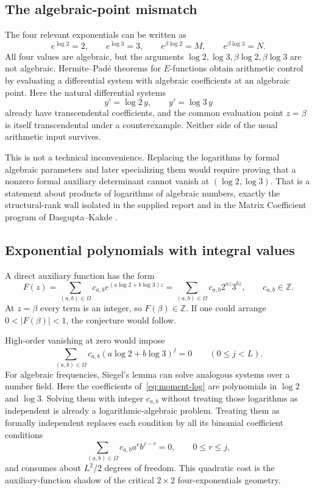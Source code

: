 \documentclass[11pt,oneside]{article}
\theoremstyle{definition}
\theoremstyle{remark}
\newcommand{\Z}{\mathbb Z}
\begin{document}
\subsection{The algebraic-point mismatch}

The four relevant exponentials can be written as
\[
 e^{\log2}=2,\qquad e^{\log3}=3,
 \qquad e^{\beta\log2}=M,
 \qquad e^{\beta\log3}=N.
\]
All four values are algebraic, but the arguments $\log2,\log3,\beta\log2,\beta\log3$ are not
algebraic.  Hermite--Pad\'e theorems for $E$-functions obtain arithmetic control by evaluating
a differential system with algebraic coefficients at an algebraic point.  Here the natural
differential systems
\[
 y'=\log2\,y,
 \qquad
 y'=\log3\,y
\]
already have transcendental coefficients, and the common evaluation point $z=\beta$ is itself
transcendental under a counterexample.  Neither side of the usual arithmetic input survives.

This is not a technical inconvenience.  Replacing the logarithms by formal algebraic
parameters and later specializing them would require proving that a nonzero formal auxiliary
determinant cannot vanish at $(\log2,\log3)$.  That is a statement about products of
logarithms of algebraic numbers, exactly the structural-rank wall isolated in the supplied
report and in the Matrix Coefficient program of Dasgupta--Kakde
\cite{DasguptaKakde2024,DasguptaKakde2026}.

\subsection{Exponential polynomials with integral values}

A direct auxiliary function has the form
\begin{equation}
 F(z)=\sum_{(a,b)\in\Omega}c_{a,b}
       e^{(a\log2+b\log3)z}
     =\sum_{(a,b)\in\Omega}c_{a,b}2^{az}3^{bz},
 \qquad c_{a,b}\in\Z.
 \label{eq:direct-exp-poly}
\end{equation}
At $z=\beta$ every term is an integer, so $F(\beta)\in\Z$.  If one could arrange
$0<|F(\beta)|<1$, the conjecture would follow.

High-order vanishing at zero would impose
\begin{equation}
 \sum_{(a,b)\in\Omega}c_{a,b}(a\log2+b\log3)^j=0
 \qquad(0\le j<L).
 \label{eq:moment-log}
\end{equation}
For algebraic frequencies, Siegel's lemma can solve analogous systems over a number field.
Here the coefficients of~\eqref{eq:moment-log} are polynomials in $\log2$ and $\log3$.
Solving them with integer $c_{a,b}$ without treating those logarithms as independent is
already a logarithmic-algebraic problem.  Treating them as formally independent replaces each
condition by all its binomial coefficient conditions
\[
 \sum_{(a,b)\in\Omega}c_{a,b}a^rb^{j-r}=0,
 \qquad 0\le r\le j,
\]
and consumes about $L^2/2$ degrees of freedom.  This quadratic cost is the auxiliary-function
shadow of the critical $2\times2$ four-exponentials geometry.
\end{document}
